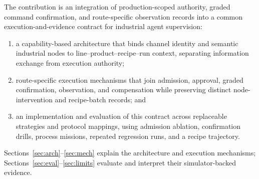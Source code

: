 The contribution is an integration of production-scoped authority, graded
command confirmation, and route-specific observation records into a common
execution-and-evidence contract for industrial agent supervision:
\begin{enumerate}
\item a capability-based architecture that binds channel identity and
semantic industrial nodes to line--product--recipe--run context, separating
information exchange from execution authority;
\item route-specific execution mechanisms that join admission, approval,
graded confirmation, observation, and compensation while preserving
distinct node-intervention and recipe-batch records; and
\item an implementation and evaluation of this contract across replaceable
strategies and protocol mappings, using admission ablation, confirmation
drills, process missions, repeated regression runs, and a recipe trajectory.
\end{enumerate}

Sections~\ref{sec:arch}--\ref{sec:mech} explain the architecture and execution
mechanisms; Sections~\ref{sec:eval}--\ref{sec:limits} evaluate and interpret
their simulator-backed evidence.
